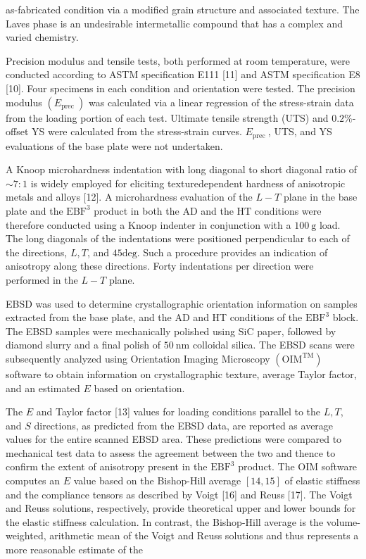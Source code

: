 \documentclass[10pt]{article}
\begin{document}
as-fabricated condition via a modified grain structure and associated texture. The Laves phase is an undesirable intermetallic compound that has a complex and varied chemistry.

Precision modulus and tensile tests, both performed at room temperature, were conducted according to ASTM specification E111 [11] and ASTM specification E8 [10]. Four specimens in each condition and orientation were tested. The precision modulus $\left(E_{\text {prec }}\right)$ was calculated via a linear regression of the stress-strain data from the loading portion of each test. Ultimate tensile strength (UTS) and $0.2 \%$-offset YS were calculated from the stress-strain curves. $E_{\text {prec }}$, UTS, and YS evaluations of the base plate were not undertaken.

A Knoop microhardness indentation with long diagonal to short diagonal ratio of $\sim 7: 1$ is widely employed for eliciting texturedependent hardness of anisotropic metals and alloys [12]. A microhardness evaluation of the $L-T$ plane in the base plate and the $\mathrm{EBF}^{3}$ product in both the $\mathrm{AD}$ and the $\mathrm{HT}$ conditions were therefore conducted using a Knoop indenter in conjunction with a $100 \mathrm{~g}$ load. The long diagonals of the indentations were positioned perpendicular to each of the directions, $L, T$, and $45 \mathrm{deg}$. Such a procedure provides an indication of anisotropy along these directions. Forty indentations per direction were performed in the $L-T$ plane.

EBSD was used to determine crystallographic orientation information on samples extracted from the base plate, and the $\mathrm{AD}$ and HT conditions of the $\mathrm{EBF}^{3}$ block. The EBSD samples were mechanically polished using $\mathrm{SiC}$ paper, followed by diamond slurry and a final polish of $50 \mathrm{~nm}$ colloidal silica. The EBSD scans were subsequently analyzed using Orientation Imaging Microscopy $\left(\mathrm{OIM}^{\mathrm{TM}}\right)$ software to obtain information on crystallographic texture, average Taylor factor, and an estimated $E$ based on orientation.

The $E$ and Taylor factor [13] values for loading conditions parallel to the $L, T$, and $S$ directions, as predicted from the EBSD data, are reported as average values for the entire scanned EBSD area. These predictions were compared to mechanical test data to assess the agreement between the two and thence to confirm the extent of anisotropy present in the $\mathrm{EBF}^{3}$ product. The OIM software computes an $E$ value based on the Bishop-Hill average $[14,15]$ of elastic stiffness and the compliance tensors as described by Voigt [16] and Reuss [17]. The Voigt and Reuss solutions, respectively, provide theoretical upper and lower bounds for the elastic stiffness calculation. In contrast, the Bishop-Hill average is the volume-weighted, arithmetic mean of the Voigt and Reuss solutions and thus represents a more reasonable estimate of the
\end{document}
